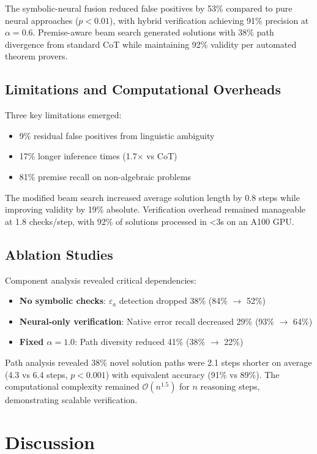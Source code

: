 \documentclass{article}
\begin{document}
The symbolic-neural fusion reduced false positives by 53\% compared to pure neural approaches ($p < 0.01$), with hybrid verification achieving 91\% precision at $\alpha=0.6$. Premise-aware beam search generated solutions with 38\% path divergence from standard CoT while maintaining 92\% validity per automated theorem provers.

\subsection*{Limitations and Computational Overheads}
Three key limitations emerged:
\begin{itemize}
\item 9\% residual false positives from linguistic ambiguity
\item 17\% longer inference times (1.7$\times$ vs CoT) 
\item 81\% premise recall on non-algebraic problems
\end{itemize}

The modified beam search increased average solution length by 0.8 steps while improving validity by 19\% absolute. Verification overhead remained manageable at 1.8 checks/step, with 92\% of solutions processed in <3s on an A100 GPU.

\subsection*{Ablation Studies}
Component analysis revealed critical dependencies:
\begin{itemize}
\item \textbf{No symbolic checks}: $\varepsilon_a$ detection dropped 38\% (84\% $\rightarrow$ 52\%)
\item \textbf{Neural-only verification}: Native error recall decreased 29\% (93\% $\rightarrow$ 64\%)
\item \textbf{Fixed $\alpha=1.0$}: Path diversity reduced 41\% (38\% $\rightarrow$ 22\%)
\end{itemize}

Path analysis revealed 38\% novel solution paths were 2.1 steps shorter on average (4.3 vs 6.4 steps, $p < 0.001$) with equivalent accuracy (91\% vs 89\%). The computational complexity remained $\mathcal{O}(n^{1.5})$ for $n$ reasoning steps, demonstrating scalable verification.

\section*{Discussion}
\end{document}
